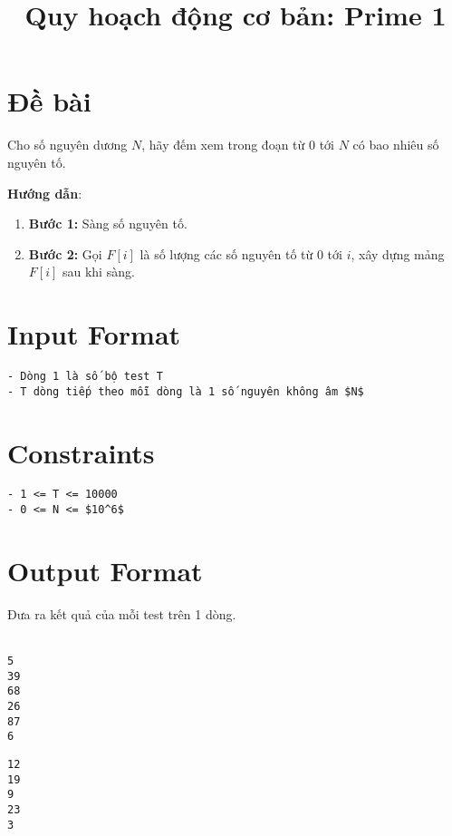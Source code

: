\documentclass{article}
\title{Quy hoạch động cơ bản: Prime 1}
\author{}
\date{}
\begin{document}
\maketitle

\section*{Đề bài}

Cho số nguyên dương $N$, hãy đếm xem trong đoạn từ $0$ tới $N$ có bao nhiêu số nguyên tố.

\textbf{Hướng dẫn}:
\begin{enumerate}
  \item \textbf{Bước 1:} Sàng số nguyên tố.
  \item \textbf{Bước 2:} Gọi $F[i]$ là số lượng các số nguyên tố từ $0$ tới $i$, xây dựng mảng $F[i]$ sau khi sàng.
\end{enumerate}

\section*{Input Format}

\begin{verbatim}
- Dòng 1 là số bộ test T
- T dòng tiếp theo mỗi dòng là 1 số nguyên không âm $N$
\end{verbatim}

\section*{Constraints}

\begin{verbatim}
- 1 <= T <= 10000
- 0 <= N <= $10^6$
\end{verbatim}

\section*{Output Format}

Đưa ra kết quả của mỗi test trên 1 dòng.
\\
\\
\begin{minipage}[t]{0.45\textwidth}
\begin{tcolorbox}[colback=green!10!white,colframe=green!50!black,title=Sample Input 0]
\begin{verbatim}
5
39
68
26
87
6
\end{verbatim}
\end{tcolorbox}
\end{minipage}
\hfill
\begin{minipage}[t]{0.45\textwidth}
\begin{tcolorbox}[colback=red!10!white,colframe=red!50!black,title=Sample Output 0]
\begin{verbatim}
12
19
9
23
3
\end{verbatim}
\end{tcolorbox}
\end{minipage}
\end{document}
